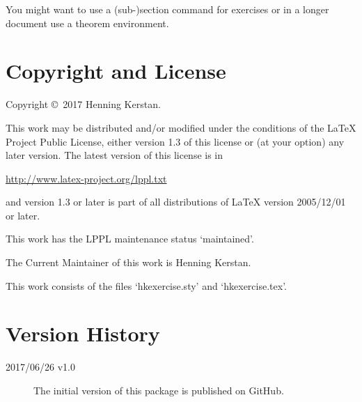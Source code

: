 \documentclass[
  twocolumn,%
  fontsize=9pt,%
  DIV=calc,%
  numbers=noendperiod%
]{scrartcl}
\begin{document}
\noindent You might want to use a (sub-)section command for exercises or in a longer document use a theorem environment.

\section{Copyright and License}
Copyright \copyright\ 2017 Henning Kerstan.\medskip

\noindent This work may be distributed and/or modified under the conditions of the LaTeX Project Public License, either version 1.3 of this license or (at your option) any later version. The latest version of this license is in\medskip
 
   \url{http://www.latex-project.org/lppl.txt}\medskip
   
\noindent and version 1.3 or later is part of all distributions of LaTeX version 2005/12/01 or later.\medskip
 
 \noindent This work has the LPPL maintenance status `maintained'.\medskip
 
 \noindent The Current Maintainer of this work is Henning Kerstan.\medskip

 \noindent This work consists of the files `hkexercise.sty' and `hkexercise.tex'.


\section{Version History}
\begin{description}
\item[2017/06/26 v1.0] The initial version of this package is published on GitHub.
\end{description}
\end{document}
